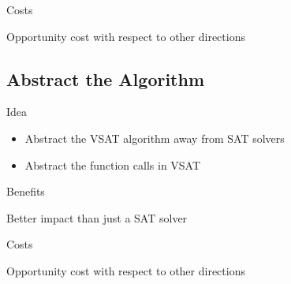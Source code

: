 \documentclass[presentation]{beamer}
\begin{document}
\begin{frame}[label={sec:org54b2c0c}]{Costs}
\begin{block}{Opportunity cost with respect to other directions}
\end{block}
\end{frame}

\subsection{Abstract the Algorithm}
\label{sec:org164412a}

\begin{frame}[label={sec:org553aac5}]{Idea}
\begin{itemize}
\item Abstract the VSAT algorithm away from SAT solvers
\item Abstract the function calls in VSAT
\end{itemize}
\end{frame}


\begin{frame}[label={sec:org2f35f53}]{Benefits}
\begin{block}{Better impact than just a SAT solver}
\end{block}
\end{frame}

\begin{frame}[label={sec:org2089906}]{Costs}
\begin{block}{Opportunity cost with respect to other directions}
\end{block}
\end{frame}
\end{document}
